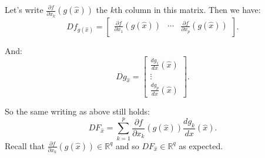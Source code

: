\documentclass{article}
\newcommand{\R}{\ensuremath{\mathbb{R}}}
\begin{document}
\begin{enumerate}
{	Let's write $\frac{\partial f}{\partial x_k}(g(\hat{x}))$ the $k$th column in this matrix. Then we have:
	$$Df_{g(\hat{x})} = \left[\begin{array}{ccc}
	\frac{\partial f}{\partial x_1}(g(\hat{x})) & \cdots & \frac{\partial f}{\partial x_p}(g(\hat{x}))
	\end{array}\right].$$
	
	And: 
	$$Dg_{\hat{x}} = \left[\begin{array}{c}
	\frac{dg_1}{dx}(\hat{x}) \\
	\vdots \\
	\frac{dg_p}{dx}(\hat{x})
	\end{array}\right].$$
	
	So the same writing as above still holds:
	$$DF_{\hat{x}} = \sum_{k=1}^p \frac{\partial f}{\partial x_k}(g(\hat{x})) \frac{dg_k}{dx}(\hat{x}).$$
	Recall that $\frac{\partial f}{\partial x_k}(g(\hat{x})) \in \R^q$ and so $DF_{\hat{x}}\in \R^q$ as expected.
	}
\end{enumerate}
\end{document}
